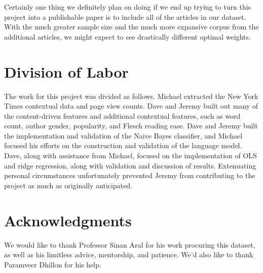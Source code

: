 \documentclass[fleqn,12pt]{SelfArx} %
\begin{document}
Certainly one thing we definitely plan on doing if we end up trying to turn this project into a publishable paper is to include all of the articles in our dataset. With the much greater sample size and the much more expansive corpus from the additional articles, we might expect to see drastically different optimal weights. 

\section{Division of Labor}

The work for this project was divided as follows. Michael extracted the New York Times contextual data and page view counts. Dave and Jeremy built out many of the content-driven features and additional contextual features, such as word count, author gender, popularity, and Flesch reading ease. Dave and Jeremy built the implementation and validation of the Naive Bayes classifier, and Michael focused his efforts on the construction and validation of the language model. Dave, along with assistance from Michael, focused on the implementation of OLS and ridge regression, along with validation and discussion of results. Extenuating personal circumstances unfortunately prevented Jeremy from contributing to the project as much as originally anticipated.

\section*{Acknowledgments} %

We would like to thank Professor Sinan Aral for his work procuring this dataset, as well as his limitless advice, mentorship, and patience. We'd also like to thank Paramveer Dhillon for his help.





\end{document}
